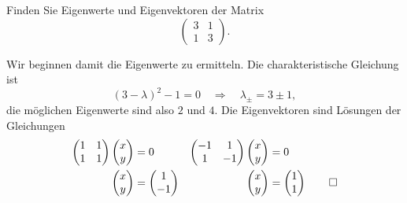 Finden Sie Eigenwerte und Eigenvektoren der Matrix
\[
\begin{pmatrix}
3&1\\
1&3
\end{pmatrix}.
\]


\begin{loesung}
Wir beginnen damit die Eigenwerte zu ermitteln.
Die charakteristische Gleichung ist
\[
(3-\lambda)^2-1=0\quad\Rightarrow\quad\lambda_{\pm}=3\pm 1,
\]
die möglichen Eigenwerte sind also $2$ und $4$. Die Eigenvektoren sind
Lösungen der Gleichungen
\begin{align*}
\begin{pmatrix}1&1\\1&1\end{pmatrix}\begin{pmatrix}x\\y\end{pmatrix}&=0
&
\begin{pmatrix}-1&1\\1&-1\end{pmatrix}\begin{pmatrix}x\\y\end{pmatrix}&=0
\\
\begin{pmatrix}x\\y\end{pmatrix}&=\begin{pmatrix}1\\-1\end{pmatrix}
&
\begin{pmatrix}x\\y\end{pmatrix}&=\begin{pmatrix}1\\1\end{pmatrix}
\qedhere
\end{align*}
\end{loesung}


